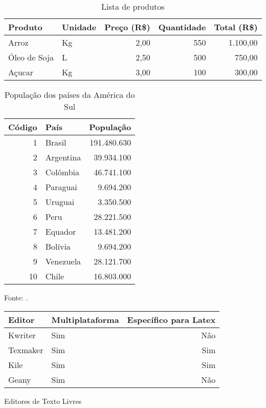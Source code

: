 \begin{table}[htb]
\centering
\caption{Lista de produtos}
\label{tabela:lista_produtos}
\begin{tabularx}{\textwidth}{X|l|r|r|r} \hline
Produto      & Unidade & Preço (R\$) & Quantidade & Total (R\$) \\ \hline
Arroz        & Kg      & 2,00        & 550        & 1.100,00    \\
Óleo de Soja & L       & 2,50        & 500        & 750,00      \\
Açucar       & Kg      & 3,00        & 100        & 300,00      \\ \hline
\end{tabularx}
\end{table}

\begin{table}[htb]
\centering
\caption{População dos países da América do Sul} \label{tabela:populacao_america_sul}
\begin{tabular}{r|l|r}        \hline
Código  & País            & População   \\ \hline
1       & Brasil          & 191.480.630 \\
2       & Argentina       &  39.934.100 \\
3       & Colômbia        &  46.741.100 \\
4       & Paraguai        &   9.694.200 \\
5       & Uruguai         &   3.350.500 \\
6       & Peru            &  28.221.500 \\
7       & Equador         &  13.481.200 \\
8       & Bolívia         &   9.694.200 \\
9       & Venezuela       &  28.121.700 \\
10      & Chile           &  16.803.000 \\ \hline
\end{tabular}

\begin{small}
Fonte: .
\end{small}
\end{table}

\begin{quadro}[htb]
\centering
\begin{tabular}{|l|l|r|}        \hline
Editor     & Multiplataforma & Específico para Latex \\ \hline
Kwriter    & Sim             & Não                   \\
Texmaker   & Sim             & Sim                   \\
Kile       & Sim             & Sim                   \\
Geany      & Sim             & Não                   \\ \hline
\end{tabular}
\caption{Editores de Texto Livres}
\label{quadro:editores_texto_livres}
\end{quadro}

